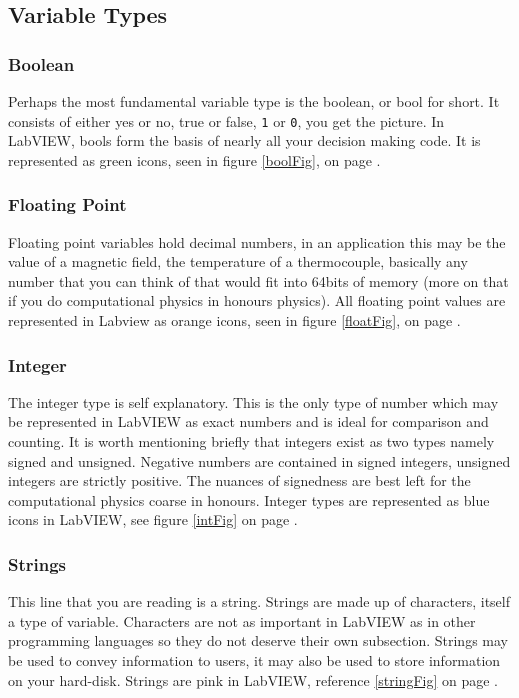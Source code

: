 	\subsection{Variable Types}
	\subsubsection{Boolean}
	Perhaps the most fundamental variable type is the boolean, or bool for short. It consists of either yes or no, true or false, \texttt{1} or \texttt{0}, you get the picture. In LabVIEW, bools form the basis of nearly all your decision making code. It is represented as green icons, seen in figure \ref{boolFig}, on page \pageref{boolfig}.
	\subsubsection{Floating Point}
	Floating point variables hold decimal numbers, in an application this may be the value of a magnetic field, the temperature of a thermocouple, basically any number that you can think of that would fit into 64bits of memory (more on that if you do computational physics in honours physics). All floating point values are represented in Labview as orange icons, seen in figure \ref{floatFig}, on page \pageref{floatFig}.
	\subsubsection{Integer}
	The integer type is self explanatory. This is the only type of number which may be represented in LabVIEW as exact numbers and is ideal for comparison and counting. It is worth mentioning briefly that integers exist as two types namely signed and unsigned. Negative numbers are contained in signed integers, unsigned integers are strictly positive. The nuances of signedness are best left for the computational physics coarse in honours. Integer types are represented as blue icons in LabVIEW, see figure \ref{intFig} on page \pageref{intFig}.
	\subsubsection{Strings}
	This line that you are reading is a string. Strings are made up of characters, itself a type of variable. Characters are not as important in LabVIEW as in other programming languages so they do not deserve their own subsection. Strings may be used to convey information to users, it may also be used to store information on your hard-disk. Strings are pink in LabVIEW, reference \ref{stringFig} on page \pageref{stringFig}.
